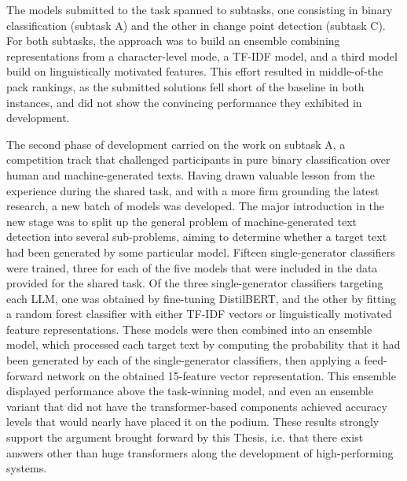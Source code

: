 The models submitted to the task spanned to subtasks, one consisting in binary classification (subtask A) and the other in change point detection (subtask C).
For both subtasks, the approach was to build an ensemble combining representations from a character-level mode, a TF-IDF model, and a third model build on linguistically motivated features.
This effort resulted in middle-of-the pack rankings, as the submitted solutions fell short of the baseline in both instances, and did not show the convincing performance they exhibited in development.

The second phase of development carried on the work on subtask A, a competition track that challenged participants in pure binary classification over human and machine-generated texts.
Having drawn valuable lesson from the experience during the shared task, and with a more firm grounding the latest research, a new batch of models was developed.
The major introduction in the new stage was to split up the general problem of machine-generated text detection into several sub-problems, aiming to determine whether a target text had been generated by some particular model.
Fifteen single-generator classifiers were trained, three for each of the five models that were included in the data provided for the shared task.
Of the three single-generator classifiers targeting each LLM, one was obtained by fine-tuning DistilBERT, and the other by fitting a random forest classifier with either TF-IDF vectors or linguistically motivated feature representations.
These models were then combined into an ensemble model, which processed each target text by computing the probability that it had been generated by each of the single-generator classifiers, then applying a feed-forward network on the obtained 15-feature vector representation.
This ensemble displayed performance above the task-winning model, and even an ensemble variant that did not have the transformer-based components achieved accuracy levels that would nearly have placed it on the podium.
These results strongly support the argument brought forward by this Thesis, i.e. that there exist answers other than huge transformers along the development of high-performing systems.

